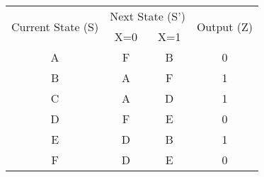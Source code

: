 \documentclass{vhdl-assignment}
\begin{document}
\begin{center}
    \begin{tabular}{|c|cc|c|}
        \hline
        \multirow{2}{*}{Current State (S)} & \multicolumn{2}{c|}{Next State (S')} & \multirow{2}{*}{Output (Z)}     \\ \cline{2-3}
                                           & \multicolumn{1}{c|}{X=0}             & X=1                         &   \\ \hline
        A                                  & \multicolumn{1}{c|}{F  }             & B                           & 0 \\ \hline
        B                                  & \multicolumn{1}{c|}{A  }             & F                           & 1 \\ \hline
        C                                  & \multicolumn{1}{c|}{A  }             & D                           & 1 \\ \hline
        D                                  & \multicolumn{1}{c|}{F  }             & E                           & 0 \\ \hline
        E                                  & \multicolumn{1}{c|}{D  }             & B                           & 1 \\ \hline
        F                                  & \multicolumn{1}{c|}{D  }             & E                           & 0 \\ \hline
    \end{tabular}
\end{center}
\end{document}
